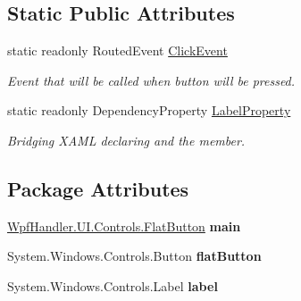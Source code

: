 \subsection*{Static Public Attributes}
\begin{DoxyCompactItemize}
\item 
static readonly Routed\+Event \mbox{\hyperlink{class_wpf_handler_1_1_u_i_1_1_controls_1_1_flat_button_a69190a203535d031a46aa317c5fa93e2}{Click\+Event}}
\begin{DoxyCompactList}\small\item\em Event that will be called when button will be pressed. \end{DoxyCompactList}\item 
static readonly Dependency\+Property \mbox{\hyperlink{class_wpf_handler_1_1_u_i_1_1_controls_1_1_flat_button_acad3d234805ceee99eeced499fe8cd80}{Label\+Property}}
\begin{DoxyCompactList}\small\item\em Bridging X\+A\+ML declaring and the member. \end{DoxyCompactList}\end{DoxyCompactItemize}
\subsection*{Package Attributes}
\begin{DoxyCompactItemize}
\item 
\mbox{\label{class_wpf_handler_1_1_u_i_1_1_controls_1_1_flat_button_a26e3853965c8e0f9bc10fe25d4ad54f2}} 
\mbox{\hyperlink{class_wpf_handler_1_1_u_i_1_1_controls_1_1_flat_button}{Wpf\+Handler.\+U\+I.\+Controls.\+Flat\+Button}} {\bfseries main}
\item 
\mbox{\label{class_wpf_handler_1_1_u_i_1_1_controls_1_1_flat_button_abd241b6a495c587914bde27d925e5fb7}} 
System.\+Windows.\+Controls.\+Button {\bfseries flat\+Button}
\item 
\mbox{\label{class_wpf_handler_1_1_u_i_1_1_controls_1_1_flat_button_a40d13fb4b546b97391efb5ae45b621b7}} 
System.\+Windows.\+Controls.\+Label {\bfseries label}
\end{DoxyCompactItemize}
